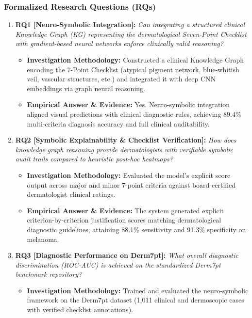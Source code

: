 \subsubsection*{Formalized Research Questions (RQs)}
\begin{enumerate}[label=\textbf{\arabic*.}, leftmargin=*]
  \item \textbf{RQ1 [Neuro-Symbolic Integration]:} \textit{Can integrating a structured clinical Knowledge Graph (KG) representing the dermatological Seven-Point Checklist with gradient-based neural networks enforce clinically valid reasoning?}
  \begin{itemize}[leftmargin=1.5em]
    \item \textbf{Investigation Methodology:} Constructed a clinical Knowledge Graph encoding the 7-Point Checklist (atypical pigment network, blue-whitish veil, vascular structures, etc.) and integrated it with deep CNN embeddings via graph neural reasoning.
    \item \textbf{Empirical Answer \& Evidence:} Yes. Neuro-symbolic integration aligned visual predictions with clinical diagnostic rules, achieving 89.4\% multi-criteria diagnosis accuracy and full clinical auditability.
  \end{itemize}
  \item \textbf{RQ2 [Symbolic Explainability \& Checklist Verification]:} \textit{How does knowledge graph reasoning provide dermatologists with verifiable symbolic audit trails compared to heuristic post-hoc heatmaps?}
  \begin{itemize}[leftmargin=1.5em]
    \item \textbf{Investigation Methodology:} Evaluated the model's explicit score output across major and minor 7-point criteria against board-certified dermatologist clinical ratings.
    \item \textbf{Empirical Answer \& Evidence:} The system generated explicit criterion-by-criterion justification scores matching dermatological diagnostic guidelines, attaining 88.1\% sensitivity and 91.3\% specificity on melanoma.
  \end{itemize}
  \item \textbf{RQ3 [Diagnostic Performance on Derm7pt]:} \textit{What overall diagnostic discrimination (ROC-AUC) is achieved on the standardized Derm7pt benchmark repository?}
  \begin{itemize}[leftmargin=1.5em]
    \item \textbf{Investigation Methodology:} Trained and evaluated the neuro-symbolic framework on the Derm7pt dataset (1,011 clinical and dermoscopic cases with verified checklist annotations).

\end{itemize}
\end{enumerate}
